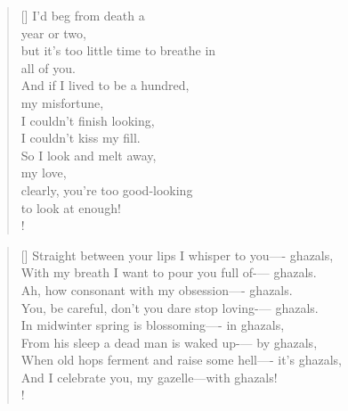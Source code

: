 \documentclass[]{article}
\begin{document}
\vspace*{0.075\textheight}
\settowidth{\versewidth}{I'd beg from death   }
\begin{verse}[\versewidth]
I'd beg from death a\\
year or two,\\
but it's too little time to breathe in\\
all of you.\\
And if I lived to be a hundred,\\
my misfortune,\\
I couldn't finish looking,\\
I couldn't kiss my fill.\\
So I look and melt away,\\
my love,\\
clearly, you're too good-looking\\
to look at enough!\\!
\end{verse}
\bigskip \bigskip \bigskip \bigskip

\settowidth{\versewidth}{With my breath I want to pour you full of—ghazals.}
\begin{verse}[\versewidth]
Straight between your lips I whisper to you—- ghazals,\\
With my breath I want to pour you full of-— ghazals.\\
Ah, how consonant with my obsession—- ghazals.\\
You, be careful, don't you dare stop loving-— ghazals.\\
In midwinter spring is blossoming—- in ghazals,\\
From his sleep a dead man is waked up-— by ghazals,\\
When old hops ferment and raise some hell—- it's ghazals,\\
And I celebrate you, my gazelle—with ghazals!\\!
\end{verse}
\newpage
\end{document}

